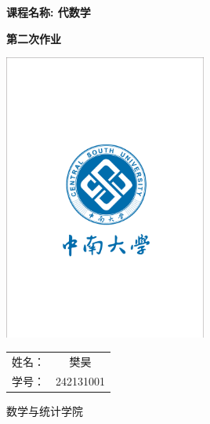

\begin{titlepage}
    \centering %


    {\Large\bfseries 课程名称: 代数学 \par}
    \vspace{1.5cm}

    {\Huge\bfseries 第二次作业 \par}
    \vspace{2cm}

    \includegraphics[width=0.5\textwidth, trim={3cm 5cm 3cm 5cm}, clip]{picture/csu.pdf}
    
    {\Large
    \begin{tabular}{lc}
        姓名： & 樊昊 \\
        学号： & 242131001 \\
    \end{tabular}
    }    
    
    \vfill %

    {\large 数学与统计学院 \par}
\end{titlepage}